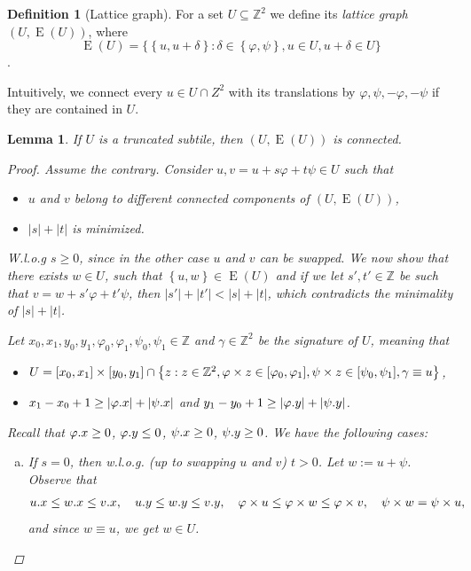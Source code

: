 \documentclass[11pt, letterpaper]{article}
\theoremstyle{plain}
\newtheorem{lemma}{Lemma}
\theoremstyle{definition}
\newtheorem{definition}{Definition}
\theoremstyle{remark}
\newcommand{\Z}{\mathbb{Z}}
\renewcommand{\phi}{\varphi}
\newcommand{\set}[1]{\left\lbrace #1 \right\rbrace}
\newcommand{\bigset}[1]{\big \lbrace #1 \big \rbrace}
\newcommand{\eq}[1]{\begin{align*} #1 \end{align*}}
\DeclareMathOperator*{\Edges}{E}
\begin{document}
\begin{definition}[Lattice graph]
	For a set $U \subseteq \Z^2$ we define its \emph{lattice graph} $(U, \Edges(U))$, where
	\[ \Edges(U) = \bigset{\set{u, u + \delta} : \delta \in \set{\phi, \psi}, u \in U, u + \delta \in U}\].
\end{definition}
Intuitively, we connect every $u \in U \cap Z^2$ with its translations by $\phi, \psi, -\phi, -\psi$ if they are contained in $U$.

\begin{lemma}\label{lattice_graph_connectivity}
	If $U$ is a truncated subtile, then $(U, \Edges(U))$ is connected.
	\begin{proof}
		Assume the contrary.
		Consider $u, v = u + s \phi + t \psi \in U$ such that
		\begin{itemize}
			\item $u$ and $v$ belong to different connected components of $(U, \Edges(U))$,
			\item $|s| + |t|$ is minimized.
		\end{itemize}
		W.l.o.g $s \ge 0$, since in the other case $u$ and $v$ can be swapped.
		We now show that there exists $w \in U$, such that $\set{u, w} \in \Edges(U)$ and if we let $s', t' \in \Z$ be such that $v = w + s'\phi + t'\psi$, then $|s'| + |t'| < |s| + |t|$, which contradicts the minimality of $|s| + |t|$. 
	
		Let $x_0, x_1, y_0, y_1, \phi_0, \phi_1, \psi_0, \psi_1 \in \Z$ and $\gamma \in \Z^2$ be the signature of $U$, meaning that
		\begin{itemize}
			\item $ U = [x_0, x_1] \times [y_0, y_1] \cap \set{z : z \in \Z^2, \h{z} \in [\phi_0, \phi_1], \s{z} \in [\psi_0, \psi_1], \gamma \equiv u}$,
			\item $x_1 - x_0 + 1 \ge |\x{\phi}| + |\x{\psi}|$ and $y_1 - y_0 + 1 \ge |\y{\phi}| + |\y{\psi}|$.
		\end{itemize}
		
		Recall that $\x{\phi} \ge 0$, $\y{\phi} \le 0$, $\psi.x \ge 0$, $\psi.y \ge 0$. We have the following cases:
		\begin{enumerate}[(a)]
			\item \label{it:s0_tneg} If $s = 0$, then w.l.o.g. (up to swapping $u$ and $v$) $t > 0$. Let $w := u + \psi$. Observe that
				\eq{
					\x{u} \le \x{w} \le \x{v}, \quad \y{u} \le \y{w} \le \y{v}, \quad \h{u} \le \h{w} \le \h{v}, \quad \s{w} = \s{u},
				}
				and since $w \equiv u$, we get $w \in U$. 
			

\end{enumerate}
\end{proof}
\end{lemma}
\end{document}
